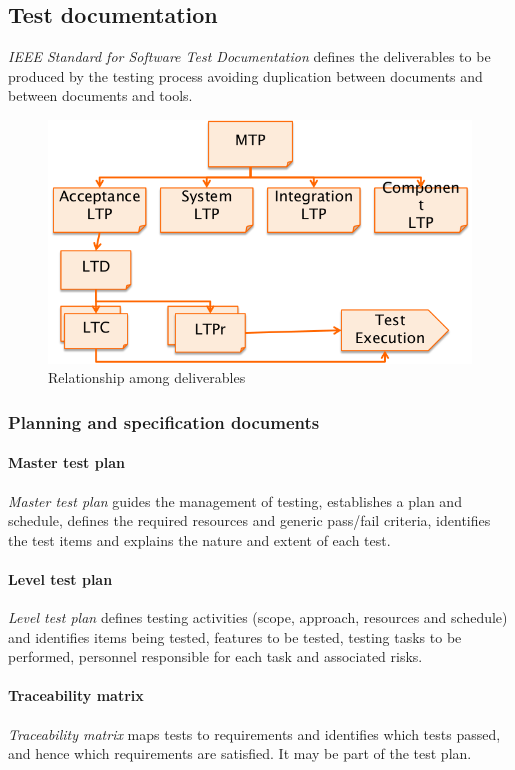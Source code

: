 \subsection{Test documentation}
\emph{IEEE Standard for Software Test Documentation} defines the deliverables to be produced by the testing process avoiding duplication between documents and between documents and tools.

\begin{figure}[hbtp]
\centering
\includegraphics[scale=0.3]{images/deliverables.png}
\caption{Relationship among deliverables}
\end{figure}

\subsubsection{Planning and specification documents}
\paragraph{Master test plan}
\emph{Master test plan} guides the management of testing, establishes a plan and schedule, defines the required resources and generic pass/fail criteria, identifies the test items and explains the nature and extent of each test.

\paragraph{Level test plan}
\emph{Level test plan} defines testing activities (scope, approach, resources and schedule) and identifies items being tested, features to be tested, testing tasks to be performed, personnel responsible for each task and associated risks.

\paragraph{Traceability matrix}
\emph{Traceability matrix} maps tests to requirements and identifies which tests passed, and hence which requirements are satisfied. It may be part of the test plan.

